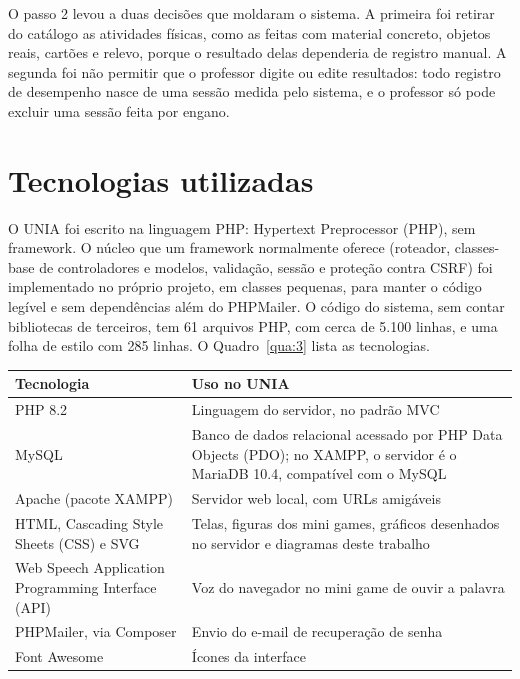 O passo 2 levou a duas decisões que moldaram o sistema. A primeira foi retirar do catálogo as atividades físicas, como as feitas com material concreto, objetos reais, cartões e relevo, porque o resultado delas dependeria de registro manual. A segunda foi não permitir que o professor digite ou edite resultados: todo registro de desempenho nasce de uma sessão medida pelo sistema, e o professor só pode excluir uma sessão feita por engano.

\section{Tecnologias utilizadas}\label{sec:3.3}

O UNIA foi escrito na linguagem PHP: Hypertext Preprocessor (PHP), sem framework. O núcleo que um framework normalmente oferece (roteador, classes-base de controladores e modelos, validação, sessão e proteção contra CSRF) foi implementado no próprio projeto, em classes pequenas, para manter o código legível e sem dependências além do PHPMailer. O código do sistema, sem contar bibliotecas de terceiros, tem 61 arquivos PHP, com cerca de 5.100 linhas, e uma folha de estilo com 285 linhas. O Quadro~\ref{qua:3} lista as tecnologias.

\begin{tabelacurta}
\setlength{\largtab}{\dimexpr\linewidth-4\tabcolsep-3\arrayrulewidth-1pt\relax}
\label{qua:3}\vspace{4pt}
\begin{tabular}{|L{0.467}|L{0.533}|}
\hline
\textbf{Tecnologia} & \textbf{Uso no UNIA} \\
\hline
PHP 8.2 & Linguagem do servidor, no padrão MVC \\ \hline
MySQL & Banco de dados relacional acessado por PHP Data Objects (PDO); no XAMPP, o servidor é o MariaDB 10.4, compatível com o MySQL \\ \hline
Apache (pacote XAMPP) & Servidor web local, com URLs amigáveis \\ \hline
HTML, Cascading Style Sheets (CSS) e SVG & Telas, figuras dos mini games, gráficos desenhados no servidor e diagramas deste trabalho \\ \hline
Web Speech Application Programming Interface (API) & Voz do navegador no mini game de ouvir a palavra \\ \hline
PHPMailer, via Composer & Envio do e-mail de recuperação de senha \\ \hline
Font Awesome & Ícones da interface \\ \hline
\end{tabular}
\end{tabelacurta}

